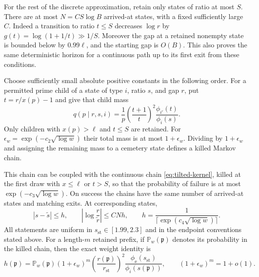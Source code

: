 For the rest of the discrete approximation, retain only states of ratio
at most $S$.  There are at most $N=C S\log B$ arrived-at states, with
a fixed sufficiently large $C$.  Indeed a transition to ratio $t\leq S$
decreases $\log r$ by $g(t)=\log(1+1/t)\gg1/S$.  Moreover the gap at a
retained nonempty state is bounded below by $0.99\ell$, and the starting
gap is $O(B)$.  This also proves the same deterministic horizon for a
continuous path up to its first exit from these conditions.

\begin{proposition}\label{prop:prime-coupling}
Choose sufficiently small absolute positive constants in the following
order.  For a permitted prime child of a state of type $i$, ratio $s$,
and gap $r$, put $t=r/x(p)-1$ and give that child mass
\begin{equation}\label{eq:prime-tilt}
 q(p\mid r,s,i)=\frac1p\left(\frac{t+1}{t}\right)^2
                    \frac{\phi_{i'}(t)}{\phi_i(s)}.
\end{equation}
Only children with $x(p)>\ell$ and $t\leq S$ are retained.  For
$\epsilon_w=\exp(-c_2\sqrt{\log w})$ their total mass is at most
$1+\epsilon_w$.  Dividing by $1+\epsilon_w$ and assigning the remaining
mass to a cemetery state defines a killed Markov chain.

This chain can be coupled with the continuous chain
\eqref{eq:tilted-kernel}, killed at the first draw with $x\leq\ell$ or
$t>S$, so that the probability of failure is at most
$\exp(-c_3\sqrt{\log w})$.  On success the chains have the same number
of arrived-at states and matching exits.  At corresponding states,
\begin{equation}\label{eq:prime-coupling-errors}
 |s-\widetilde s|\leq h,\qquad
 \left|\log\frac r{\widetilde r}\right|\leq C N h,\qquad
 h=\frac1{\lceil\exp(c_4\sqrt{\log w})\rceil}.
\end{equation}
All statements are uniform in $s_{\mathrm{st}}\in[1.99,2.3]$ and in the
endpoint conventions stated above.  For a length-$m$ retained prefix,
if $\mathbb P_w(\mathfrak p)$ denotes its probability in the killed
chain, then the exact weight identity is
\begin{equation}\label{eq:prime-weight}
 h(\mathfrak p)=\mathbb P_w(\mathfrak p)(1+\epsilon_w)^m
 \left(\frac{r(\mathfrak p)}{r_{\mathrm{st}}}\right)^2
 \frac{\phi_\ee(s_{\mathrm{st}})}{\phi_i(s(\mathfrak p))},
 \qquad (1+\epsilon_w)^m=1+o(1).
\end{equation}
\end{proposition}

